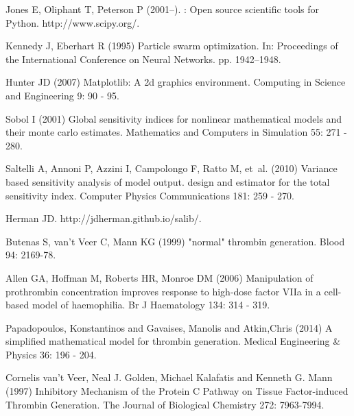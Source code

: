 \documentclass[processes,article,received,moreauthors,pdftex,12pt,a4paper]{mdpi}
\begin{document}
\begin{thebibliography}{9999}
Jones E, Oliphant T, Peterson P (2001--).
: Open source scientific tools for {Python}.
\newblock http://www.scipy.org/.

Kennedy J, Eberhart R (1995) Particle swarm optimization.
\newblock In: Proceedings of the International Conference on Neural Networks.
  pp. 1942--1948.

Hunter JD (2007) Matplotlib: A 2d graphics environment.
\newblock Computing in Science and Engineering 9: 90 - 95.

Sobol I (2001) Global sensitivity indices for nonlinear mathematical models and
  their monte carlo estimates.
\newblock Mathematics and Computers in Simulation 55: 271 - 280.

Saltelli A, Annoni P, Azzini I, Campolongo F, Ratto M, et~al. (2010) Variance
  based sensitivity analysis of model output. design and estimator for the
  total sensitivity index.
\newblock Computer Physics Communications 181: 259 - 270.

Herman JD.
\newblock http://jdherman.github.io/salib/.

Butenas S, van't Veer C, Mann KG (1999) "normal" thrombin generation.
\newblock Blood 94: 2169-78.

Allen GA, Hoffman M, Roberts HR, Monroe DM (2006) Manipulation of prothrombin
  concentration improves response to high-dose factor {VIIa} in a cell-based
  model of haemophilia.
\newblock Br J Haematology 134: 314 - 319.

Papadopoulos, Konstantinos and Gavaises, Manolis and Atkin,Chris (2014) A simplified mathematical model for thrombin generation.
\newblock Medical Engineering \& Physics 36: 196 - 204.

Cornelis van't Veer, Neal J. Golden, Michael Kalafatis and Kenneth G. Mann (1997) Inhibitory Mechanism of the Protein C Pathway on Tissue Factor-induced Thrombin Generation.
\newblock The Journal of Biological Chemistry 272: 7963-7994.

\end{thebibliography}
\end{document}
